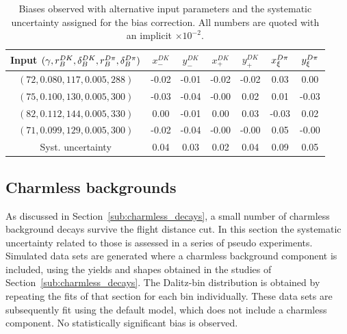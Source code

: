 
\begin{table}
  \centering
  \caption{Biases observed with alternative input parameters and the systematic uncertainty assigned for the bias correction.
  All numbers are quoted with an implicit $\times 10^{-2}$.
  \label{tab:bias_syst}
  }  



\begin{tabular}{c|cccccc}
\toprule
Input $(\gamma, r_B^{DK}, \delta_B^{DK}, r_B^{{D}\pi}, \delta_B^{{D}\pi})$ 
& $x_-^{DK} $& $y_-^{DK} $& $x_+^{DK} $& $y_+^{DK} $& $x_\xi^{{D}\pi} $& $y_\xi^{{D}\pi}$ \\
\midrule
$(72, 0.080, 117, 0.005, 288)$ & -0.02& -0.01& -0.02& -0.02& 0.03& 0.00 \\
$(75, 0.100, 130, 0.005, 300)$ & -0.03& -0.04& -0.00& 0.02& 0.01& -0.03 \\
$(82, 0.112, 144, 0.005, 330)$ & 0.00& -0.01& 0.00& 0.03& -0.03& 0.02 \\
$(71, 0.099, 129, 0.005, 300)$ & -0.02& -0.04& -0.00& -0.00& 0.05& -0.00 \\
\midrule
Syst. uncertainty & 0.04& 0.03& 0.02& 0.04& 0.09& 0.05 \\
\bottomrule
\end{tabular}

\end{table}




\subsection{Charmless backgrounds} %
\label{sub:systematics_from_charmless_backgrounds}

As discussed in Section~\ref{sub:charmless_decays}, a small number of charmless background decays survive the \D flight distance cut. In this section the systematic uncertainty related to those is assessed in a series of pseudo experiments. Simulated data sets are generated where a charmless background component is included, using the yields and shapes obtained in the studies of Section~\ref{sub:charmless_decays}. The Dalitz-bin distribution is obtained by repeating the fits of that section for each bin individually. These data sets are subsequently fit using the default model, which does not include a charmless component. No statistically significant bias is observed.

